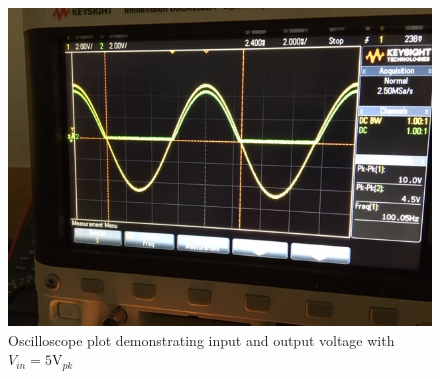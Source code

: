 \documentclass{article}
\begin{document}
\begin{figure}[H]
  \centering
  \includegraphics[width=\textwidth]{image/Part1/IMG_3693.JPG}
  \caption{Oscilloscope plot demonstrating input and output voltage with $V_{in}=5\text{V}_{pk}$}
\end{figure}
\end{document}

